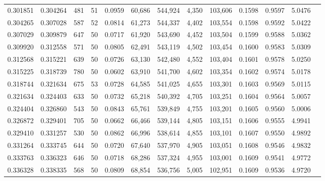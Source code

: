\begin{tabular}{rrrrrrrrrrrrr}
0.301851 & 0.304264 &   481 &  51 &                                     0.0959 &  60,686 & 544,924 &   4,350 & 103,606 & 0.1598 & 0.9597 & 5.0476 \\
0.304265 & 0.307028 &   587 &  52 &                                     0.0814 &  61,273 & 544,337 &   4,402 & 103,554 & 0.1598 & 0.9592 & 5.0422 \\
0.307029 & 0.309879 &   647 &  50 &                                     0.0717 &  61,920 & 543,690 &   4,452 & 103,504 & 0.1599 & 0.9588 & 5.0362 \\
0.309920 & 0.312558 &   571 &  50 &                                     0.0805 &  62,491 & 543,119 &   4,502 & 103,454 & 0.1600 & 0.9583 & 5.0309 \\
0.312568 & 0.315221 &   639 &  50 &                                     0.0726 &  63,130 & 542,480 &   4,552 & 103,404 & 0.1601 & 0.9578 & 5.0250 \\
0.315225 & 0.318739 &   780 &  50 &                                     0.0602 &  63,910 & 541,700 &   4,602 & 103,354 & 0.1602 & 0.9574 & 5.0178 \\
0.318744 & 0.321634 &   675 &  53 &                                     0.0728 &  64,585 & 541,025 &   4,655 & 103,301 & 0.1603 & 0.9569 & 5.0115 \\
0.321634 & 0.324403 &   633 &  50 &                                     0.0732 &  65,218 & 540,392 &   4,705 & 103,251 & 0.1604 & 0.9564 & 5.0057 \\
0.324404 & 0.326860 &   543 &  50 &                                     0.0843 &  65,761 & 539,849 &   4,755 & 103,201 & 0.1605 & 0.9560 & 5.0006 \\
0.326872 & 0.329401 &   705 &  50 &                                     0.0662 &  66,466 & 539,144 &   4,805 & 103,151 & 0.1606 & 0.9555 & 4.9941 \\
0.329410 & 0.331257 &   530 &  50 &                                     0.0862 &  66,996 & 538,614 &   4,855 & 103,101 & 0.1607 & 0.9550 & 4.9892 \\
0.331264 & 0.333745 &   644 &  50 &                                     0.0720 &  67,640 & 537,970 &   4,905 & 103,051 & 0.1608 & 0.9546 & 4.9832 \\
0.333763 & 0.336323 &   646 &  50 &                                     0.0718 &  68,286 & 537,324 &   4,955 & 103,001 & 0.1609 & 0.9541 & 4.9772 \\
0.336328 & 0.338335 &   568 &  50 &                                     0.0809 &  68,854 & 536,756 &   5,005 & 102,951 & 0.1609 & 0.9536 & 4.9720 \\

\end{tabular}
